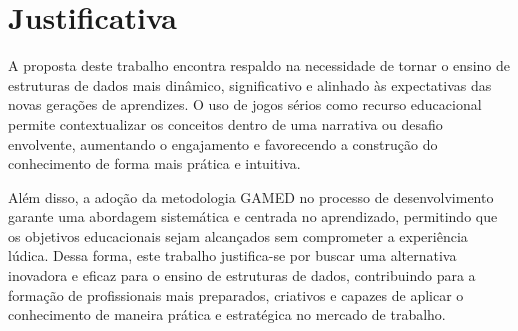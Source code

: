\section{Justificativa}

A proposta deste trabalho encontra respaldo na necessidade de tornar o ensino de estruturas de dados mais dinâmico, significativo e alinhado às expectativas das novas gerações de aprendizes. O uso de jogos sérios como recurso educacional permite contextualizar os conceitos dentro de uma narrativa ou desafio envolvente, aumentando o engajamento e favorecendo a construção do conhecimento de forma mais prática e intuitiva.

Além disso, a adoção da metodologia GAMED no processo de desenvolvimento garante uma abordagem sistemática e centrada no aprendizado, permitindo que os objetivos educacionais sejam alcançados sem comprometer a experiência lúdica. Dessa forma, este trabalho justifica-se por buscar uma alternativa inovadora e eficaz para o ensino de estruturas de dados, contribuindo para a formação de profissionais mais preparados, criativos e capazes de aplicar o conhecimento de maneira prática e estratégica no mercado de trabalho.
